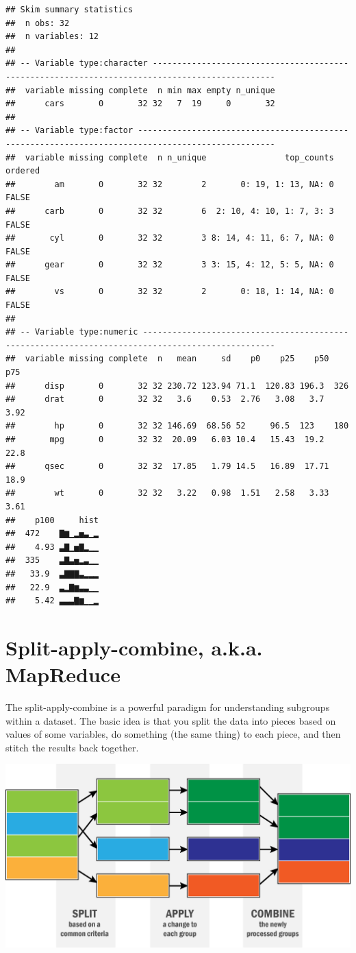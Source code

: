 \documentclass[12pt,letterpaperpaper,openany]{book}
\begin{document}
\begin{verbatim}
## Skim summary statistics
##  n obs: 32 
##  n variables: 12 
## 
## -- Variable type:character -----------------------------------------------------------------------------------------------
##  variable missing complete  n min max empty n_unique
##      cars       0       32 32   7  19     0       32
## 
## -- Variable type:factor --------------------------------------------------------------------------------------------------
##  variable missing complete  n n_unique                top_counts ordered
##        am       0       32 32        2       0: 19, 1: 13, NA: 0   FALSE
##      carb       0       32 32        6  2: 10, 4: 10, 1: 7, 3: 3   FALSE
##       cyl       0       32 32        3 8: 14, 4: 11, 6: 7, NA: 0   FALSE
##      gear       0       32 32        3 3: 15, 4: 12, 5: 5, NA: 0   FALSE
##        vs       0       32 32        2       0: 18, 1: 14, NA: 0   FALSE
## 
## -- Variable type:numeric -------------------------------------------------------------------------------------------------
##  variable missing complete  n   mean     sd    p0    p25    p50    p75
##      disp       0       32 32 230.72 123.94 71.1  120.83 196.3  326   
##      drat       0       32 32   3.6    0.53  2.76   3.08   3.7    3.92
##        hp       0       32 32 146.69  68.56 52     96.5  123    180   
##       mpg       0       32 32  20.09   6.03 10.4   15.43  19.2   22.8 
##      qsec       0       32 32  17.85   1.79 14.5   16.89  17.71  18.9 
##        wt       0       32 32   3.22   0.98  1.51   2.58   3.33   3.61
##    p100     hist
##  472    ▇▆▁▂▅▃▁▂
##    4.93 ▃▇▁▅▇▂▁▁
##  335    ▃▇▃▅▂▃▁▁
##   33.9  ▃▇▇▇▃▂▂▂
##   22.9  ▃▂▇▆▃▃▁▁
##    5.42 ▃▃▃▇▆▁▁▂
\end{verbatim}

\hypertarget{split-apply-combine-a.k.a.-mapreduce}{%
\section{Split-apply-combine, a.k.a. MapReduce}\label{split-apply-combine-a.k.a.-mapreduce}}

The split-apply-combine is a powerful paradigm for understanding subgroups within a dataset. The basic
idea is that you split the data into pieces based on values of some variables, do something (the same thing) to
each piece, and then stitch the results back together.

\includegraphics{img/split-apply-combine.png}
\end{document}
